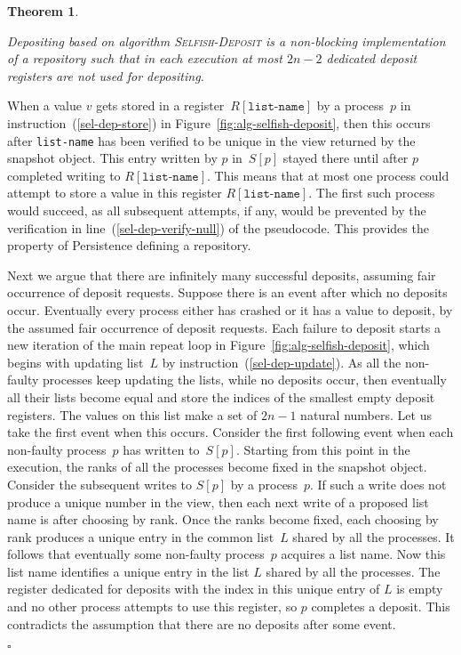 \documentclass[11pt]{article}
\newcommand{\qed}{\hfill $\square$ \smallbreak}
\newenvironment{proof}{\noindent{\bf Proof:}}{\qed}
\newtheorem{theorem}{Theorem}
\begin{document}
\begin{theorem}
\label{thm:selfish-deposit}

Depositing based on algorithm \textsc{Selfish-Deposit} is a non-blocking implementation of a repository such that in each execution at most $2n-2$ dedicated deposit registers are not  used for depositing.
\end{theorem}


\begin{proof} 
When a value $v$ gets stored in a register~$R[\texttt{list-name}]$ by a process~$p$ in instruction~(\ref{sel-dep-store}) in Figure~\ref{fig:alg-selfish-deposit}, then this occurs after \texttt{list-name} has been verified to be unique in the view returned by the snapshot object. 
This entry written by $p$ in~$S[p]$ stayed there until after $p$ completed writing to $R[\texttt{list-name}]$.
This means that at most one process could attempt to store a value in this register $R[\texttt{list-name}]$.
The first such process would succeed, as all subsequent attempts, if any, would be prevented by the verification in line~(\ref{sel-dep-verify-null}) of the pseudocode.
This provides the property of Persistence defining a repository.

Next we argue that there are infinitely many successful deposits, assuming fair occurrence  of deposit requests. 
Suppose there is an event after which no deposits occur.
Eventually every process either has crashed or it has a value to deposit, by the assumed fair occurrence of deposit requests.
Each failure to deposit starts a new iteration of the main repeat loop in Figure~\ref{fig:alg-selfish-deposit}, which begins with updating list~$L$ by instruction~(\ref{sel-dep-update}).
As all the non-faulty processes keep updating the lists, while no deposits occur, then eventually all their lists become equal and store the indices of the smallest empty deposit registers.
The values on this list make a set of $2n-1$ natural numbers. 
Let us take the first event when this occurs.
Consider the first following event when each non-faulty process~$p$ has written to~$S[p]$.
Starting from this point in the execution, the ranks of all the processes become fixed in the snapshot object.
Consider the subsequent writes to $S[p]$ by a process~$p$.
If such a write does not produce a unique number in the view, then each next write of a proposed list name is after choosing by rank.
Once the ranks become fixed, each choosing by rank produces a unique entry in the common list~$L$ shared by all the processes.
It follows that eventually some non-faulty process~$p$ acquires a list name.
Now this list name identifies a unique entry in the list $L$ shared by all the processes.
The register dedicated for deposits with the index in this unique entry of $L$ is empty and no other process attempts to use this register, so $p$ completes a deposit.
This contradicts the assumption that there are no deposits after some event.


\end{proof}
\end{document}
